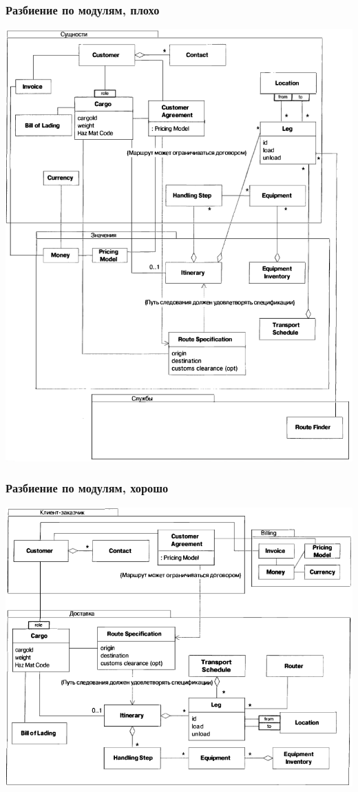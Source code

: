 \documentclass{../../slides-style}
\begin{document}
	\begin{frame}
		\frametitle{Разбиение по модулям, плохо}
		\begin{center}
			\includegraphics[height=0.9\textheight]{cargoModulesBad.png}
		\end{center}
	\end{frame}

	\begin{frame}
		\frametitle{Разбиение по модулям, хорошо}
		\begin{center}
			\includegraphics[height=0.8\textheight]{cargoModulesGood.png}
		\end{center}
	\end{frame}
\end{document}

